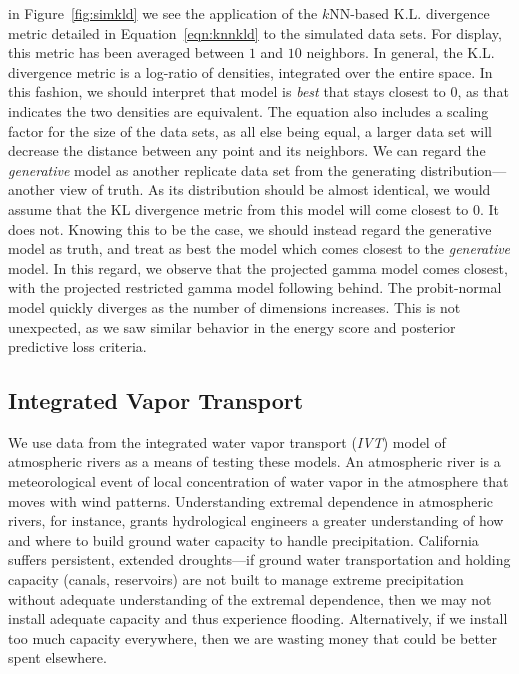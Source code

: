 in Figure~\ref{fig:simkld} we see the application of the $k$NN-based K.L. divergence metric detailed
  in Equation~\ref{eqn:knnkld} to the simulated data sets.  For display, this metric has been averaged
  between $1$ and $10$ neighbors.  In general, the K.L. divergence metric is a log-ratio
  of densities, integrated over the entire space.  In this fashion, we should interpret that model
  is \emph{best} that stays closest to 0, as that indicates the two densities are equivalent.  The
  equation also includes a scaling factor for the size of the data sets, as all else being equal, a
  larger data set will decrease the distance between any point and its neighbors.  We can regard the
  \emph{generative} model as another replicate data set from the generating distribution---another
  view of truth.  As its distribution should be almost identical, we would assume that the KL divergence
  metric from this model will come closest to 0.  It does not.  Knowing this to be the case, we should
  instead regard the generative model as truth, and treat as best the model which comes closest to the
  \emph{generative} model.  In this regard, we observe that the projected gamma model comes closest,
  with the projected restricted gamma model following behind.  The probit-normal model quickly diverges
  as the number of dimensions increases.  This is not unexpected, as we saw similar behavior in the
  energy score and posterior predictive loss criteria.

\subsection{Integrated Vapor Transport}
We use data from the integrated water vapor transport (\emph{IVT}) model \citep{guan2015}
  of atmospheric rivers as a means of testing these models.  An atmospheric river is a meteorological
  event of local concentration of water vapor in the atmosphere that moves with wind patterns.
  Understanding extremal dependence in atmospheric rivers, for instance, grants hydrological engineers
  a greater understanding of how and where to build ground water capacity to handle precipitation.
  California suffers persistent, extended droughts---if ground water transportation and holding capacity
  (canals, reservoirs) are not built to manage extreme precipitation without adequate understanding of
  the extremal dependence, then we may not install adequate capacity and thus experience flooding.
  Alternatively, if we install too much capacity everywhere, then we are wasting money that could be
  better spent elsewhere.

